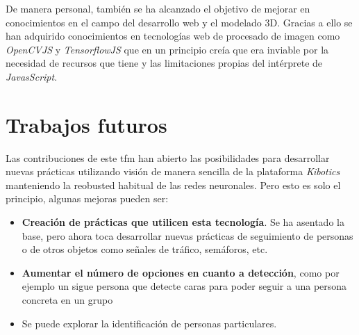 De manera personal, también se ha alcanzado el objetivo de mejorar en conocimientos en el campo del desarrollo web y el modelado 3D. Gracias a ello se han adquirido conocimientos en tecnologías web de procesado de imagen como \textit{OpenCVJS} y \textit{TensorflowJS }que en un principio creía que era inviable por la necesidad de recursos que tiene y las limitaciones propias del intérprete de \textit{JavasScript}.
\section{Trabajos futuros}
Las contribuciones de este \acrshort{tfm} han abierto las posibilidades para desarrollar nuevas prácticas utilizando visión de manera sencilla de la plataforma \textit{Kibotics} manteniendo la reobusted habitual de las redes neuronales. Pero esto es solo el principio, algunas mejoras pueden ser:

\begin{itemize}
  \item \textbf{Creación de prácticas que utilicen esta tecnología}. Se ha asentado la base, pero ahora toca desarrollar nuevas prácticas de seguimiento de personas o de otros objetos como señales de tráfico, semáforos, etc.
  \item \textbf{Aumentar el número de opciones en cuanto a detección}, como por ejemplo un sigue persona que detecte caras para poder seguir a una persona concreta en un grupo
  \item Se puede explorar la identificación de personas particulares.
\end{itemize}
